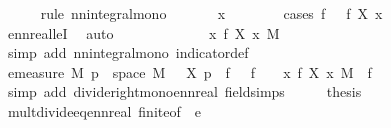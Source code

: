 \begin{isabellebody}
\ \ \ \ \isamarkupfalse%
\ {\isacharparenleft}{\kern0pt}rule\ nn{\isacharunderscore}{\kern0pt}integral{\isacharunderscore}{\kern0pt}mono{\isacharparenright}{\kern0pt}\isanewline
\ \ \ \ \isamarkupfalse%
\ \ x\isanewline
\ \ \ \ \ \ \isamarkupfalse%
\ {\isacharparenleft}{\kern0pt}cases\ {\isachardoublequoteopen}f\ {\isasymepsilon}\ {\isasymle}\ f\ {\isacharparenleft}{\kern0pt}X\ x{\isacharparenright}{\kern0pt}{\isachardoublequoteclose}{\isacharparenright}{\kern0pt}\isanewline
\ \ \ \ \ \ \isamarkupfalse%
\ ennreal{\isacharunderscore}{\kern0pt}leI\ \isamarkupfalse%
\ auto\isanewline
\ \ \ \ \isamarkupfalse%
\isanewline
\ \ \isamarkupfalse%
\ \isamarkupfalse%
\ {\isachardoublequoteopen}{\isachardot}{\kern0pt}{\isachardot}{\kern0pt}{\isachardot}{\kern0pt}\ {\isasymle}\ {\isasymintegral}\isactrlsup {\isacharplus}{\kern0pt}\ x{\isachardot}{\kern0pt}\ f\ {\isacharparenleft}{\kern0pt}X\ x{\isacharparenright}{\kern0pt}\ {\isasympartial}M{\isachardoublequoteclose}\isanewline
\ \ \ \ \isamarkupfalse%
\ {\isacharparenleft}{\kern0pt}simp\ add{\isacharcolon}{\kern0pt}\ nn{\isacharunderscore}{\kern0pt}integral{\isacharunderscore}{\kern0pt}mono\ indicator{\isacharunderscore}{\kern0pt}def{\isacharparenright}{\kern0pt}\isanewline
\ \ \isamarkupfalse%
\ \isamarkupfalse%
\ {\isachardoublequoteopen}emeasure\ M\ {\isacharbraceleft}{\kern0pt}p\ {\isasymin}\ space\ M{\isachardot}{\kern0pt}\ {\isasymepsilon}\ {\isasymle}\ X\ p{\isacharbraceright}{\kern0pt}\ {\isacharasterisk}{\kern0pt}\ f\ {\isasymepsilon}\ {\isacharslash}{\kern0pt}\ f\ {\isasymepsilon}\ {\isasymle}\ {\isacharparenleft}{\kern0pt}{\isasymintegral}\isactrlsup {\isacharplus}{\kern0pt}\ x{\isachardot}{\kern0pt}\ f\ {\isacharparenleft}{\kern0pt}X\ x{\isacharparenright}{\kern0pt}\ {\isasympartial}M{\isacharparenright}{\kern0pt}\ {\isacharslash}{\kern0pt}\ f\ {\isasymepsilon}{\isachardoublequoteclose}\isanewline
\ \ \ \ \isamarkupfalse%
\ {\isacharparenleft}{\kern0pt}simp\ add{\isacharcolon}{\kern0pt}\ divide{\isacharunderscore}{\kern0pt}right{\isacharunderscore}{\kern0pt}mono{\isacharunderscore}{\kern0pt}ennreal\ field{\isacharunderscore}{\kern0pt}simps{\isacharparenright}{\kern0pt}\isanewline
\ \ \isamarkupfalse%
\ \isamarkupfalse%
\ {\isacharquery}{\kern0pt}thesis\isanewline
\ \ \ \ \isamarkupfalse%
\ mult{\isacharunderscore}{\kern0pt}divide{\isacharunderscore}{\kern0pt}eq{\isacharunderscore}{\kern0pt}ennreal\ finite{\isacharbrackleft}{\kern0pt}of\ {\isachardoublequoteopen}{\isasymepsilon}{\isachardoublequoteclose}{\isacharbrackright}{\kern0pt}\ e{\isacharparenleft}{\kern0pt}{}{\isacharparenright}{\kern0pt}\ \isamarkupfalse%

\end{isabellebody}
